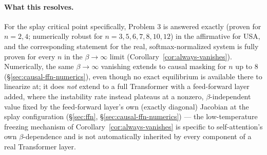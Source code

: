 \documentclass[11pt]{article}
\begin{document}
\paragraph{What this resolves.} For the splay critical point specifically, Problem 3 is answered exactly (proven for $n=2,4$; numerically robust for $n=3,5,6,7,8,10,12$) in the affirmative for USA, and the corresponding statement for the real, softmax-normalized system is fully proven for every $n$ in the $\beta\to\infty$ limit (Corollary~\ref{cor:always-vanishes}). Numerically, the same $\beta\to\infty$ vanishing extends to causal masking for $n$ up to $8$ (\S\ref{sec:causal-ffn-numerics}), even though no exact equilibrium is available there to linearize at; it does \emph{not} extend to a full Transformer with a feed-forward layer added, where the instability rate instead plateaus at a nonzero, $\beta$-independent value fixed by the feed-forward layer's own (exactly diagonal) Jacobian at the splay configuration (\S\ref{sec:ffn}, \S\ref{sec:causal-ffn-numerics}) --- the low-temperature freezing mechanism of Corollary~\ref{cor:always-vanishes} is specific to self-attention's own $\beta$-dependence and is not automatically inherited by every component of a real Transformer layer.
\end{document}
